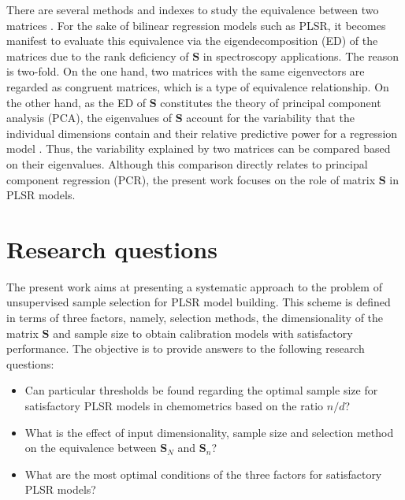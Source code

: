 \documentclass[journal=ancham,manuscript=article]{achemso}
\begin{document}
There are several methods and indexes to study the equivalence between two matrices \cite{Tomic2013}. For the sake of bilinear regression models such as PLSR, it becomes manifest to evaluate this equivalence via the eigendecomposition (ED) of the matrices due to the rank deficiency of $\mathbf{S}$ in spectroscopy applications. The reason is two-fold. On the one hand, two matrices with the same eigenvectors are regarded as congruent matrices, which is a type of equivalence relationship\cite{Horn1985}. On the other hand, as the ED of $\mathbf{S}$ constitutes the theory of principal component analysis (PCA), the eigenvalues of $\mathbf{S}$ account for the variability that the individual dimensions contain and their relative predictive power for a regression model \cite{Artemiou2013}. Thus, the variability explained by two matrices can be compared based on their eigenvalues. Although this comparison directly relates to principal component regression (PCR), the present work focuses on the role of matrix $\mathbf{S}$ in PLSR models.


\section{Research questions}

The present work aims at presenting a systematic approach to the problem of unsupervised sample selection for PLSR model building. This scheme is defined in terms of three factors, namely, selection methods, the dimensionality of the matrix $\mathbf{S}$ and sample size to obtain calibration models with satisfactory performance. The objective is to provide answers to the following research questions:

\begin{itemize}

    \item Can particular thresholds be found regarding the optimal sample size for satisfactory PLSR models in chemometrics based on the ratio $n/d$?

    \item What is the effect of input dimensionality, sample size and selection method on the equivalence between $\mathbf{S}_N$ and $\mathbf{S}_n$?
    
    \item What are the most optimal conditions of the three factors for satisfactory PLSR models?

\end{itemize}
\end{document}
